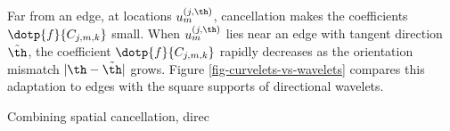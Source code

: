 Far from an edge, at locations $u_m^{(j,\th)}$, cancellation makes the coefficients $\dotp{f}{C_{j,m,k}}$ small. When $u_m^{(j,\th)}$ lies near an edge with tangent direction $\tilde\th$, the coefficient $\dotp{f}{C_{j,m,k}}$ rapidly decreases as the orientation mismatch $|\th-\tilde \th|$ grows. Figure \ref{fig-curvelets-vs-wavelets} compares this adaptation to edges with the square supports of directional wavelets.



Combining spatial cancellation, direc
